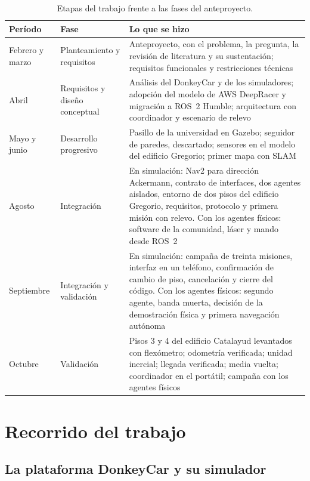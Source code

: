 \begin{table}[htbp]
  \caption{Etapas del trabajo frente a las fases del anteproyecto.}
  \label{tab:etapas}
  \footnotesize
  \begin{tabular}{@{}p{}p{}p{}@{}}
    \toprule
    \textbf{Período} & \textbf{Fase} & \textbf{Lo que se hizo} \\ \midrule
    Febrero y marzo & Planteamiento y requisitos & Anteproyecto, con el problema, la pregunta, la revisión de literatura y su sustentación; requisitos funcionales y restricciones técnicas \\ \addlinespace
    Abril & Requisitos y diseño conceptual & Análisis del DonkeyCar y de los simuladores; adopción del modelo de AWS DeepRacer y migración a ROS~2 Humble; arquitectura con coordinador y escenario de relevo \\ \addlinespace
    Mayo y junio & Desarrollo progresivo & Pasillo de la universidad en Gazebo; seguidor de paredes, descartado; sensores en el modelo del edificio Gregorio; primer mapa con SLAM \\ \addlinespace
    Agosto & Integración & En simulación: Nav2 para dirección Ackermann, contrato de interfaces, dos agentes aislados, entorno de dos pisos del edificio Gregorio, requisitos, protocolo y primera misión con relevo. Con los agentes físicos: software de la comunidad, láser y mando desde ROS~2 \\ \addlinespace
    Septiembre & Integración y validación & En simulación: campaña de treinta misiones, interfaz en un teléfono, confirmación de cambio de piso, cancelación y cierre del código. Con los agentes físicos: segundo agente, banda muerta, decisión de la demostración física y primera navegación autónoma \\ \addlinespace
    Octubre & Validación & Pisos 3 y 4 del edificio Catalayud levantados con flexómetro; odometría verificada; unidad inercial; llegada verificada; media vuelta; coordinador en el portátil; campaña con los agentes físicos \\ \bottomrule
  \end{tabular}
\end{table}

\section{Recorrido del trabajo}
\label{sec:recorrido}

\subsection{La plataforma DonkeyCar y su simulador}
\label{sec:donkeycar}

